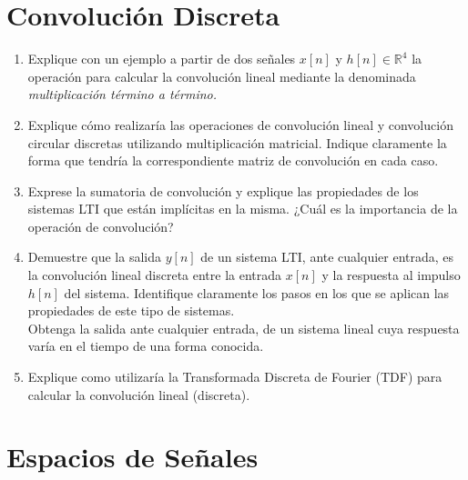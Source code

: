 \documentclass[a4paper,10pt,spanish]{article}
\begin{document}
\section{Convolución Discreta}

\begin{enumerate}
\item Explique con un ejemplo a partir de dos señales $x[n]$ y $h[n]\in\mathbb{R}^{4}$ la operación para calcular la convolución lineal mediante la denominada \textit{multiplicación término a término.}

\item Explique cómo realizaría las operaciones de convolución lineal y convolución circular discretas utilizando multiplicación matricial. Indique claramente la forma que tendría la correspondiente matriz de convolución en cada caso.

\item  Exprese la sumatoria de convolución y explique las propiedades de los sistemas LTI que están implícitas en la misma. ¿Cuál es la importancia de la operación de convolución?

\item Demuestre que la salida $y[n]$ de un sistema LTI, ante cualquier entrada, es la convolución lineal discreta entre la entrada $x[n]$ y la respuesta al impulso $h[n]$ del sistema. Identifique claramente los pasos en los que se aplican las propiedades de este tipo de sistemas.\\
Obtenga la salida ante cualquier entrada, de un sistema lineal cuya respuesta varía en el tiempo de una forma conocida.

\item Explique como utilizaría la Transformada Discreta de Fourier (TDF) para calcular la convolución lineal (discreta).
\end{enumerate}

\section{Espacios de Señales}
\end{document}
